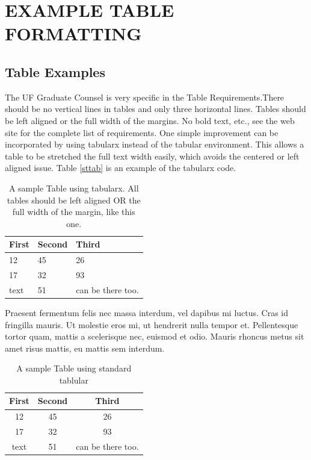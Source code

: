 \documentclass[../main.tex]{subfiles}
\begin{document}
\chapter{EXAMPLE TABLE FORMATTING} \label{lit}

\section{Table Examples}

 The UF Graduate Counsel is very specific in the Table Requirements.There should be no vertical lines in tables and only three horizontal lines. Tables should be left aligned or the full width of the margins. No bold text, etc., see the web site for the complete list of requirements. One simple improvement can be incorporated by using tabularx instead of the tabular environment. This allows a table to be stretched the full text width easily, which avoids the centered or left aligned issue. Table \ref{sttab} is an example of the tabularx code. 
 
\begin{table}[htbp]%
    \caption[Sample tabularx table]{A sample Table using tabularx. All tables should be left aligned OR the full width of the margin, like this one. }\label{sample}
    \begin{tabularx}{6.5in}{XXX}
      \hline
      First & Second & Third \\
      \hline
      12 & 45 & 26 \\
      17 & 32 & 93 \\
      text & 51 & can be there too. \\	
      \hline
    \end{tabularx}
\end{table}
 
 Praesent fermentum felis nec massa interdum, vel dapibus mi luctus. Cras id fringilla mauris. Ut molestie eros mi, ut hendrerit nulla tempor et. Pellentesque tortor quam, mattis a scelerisque nec, euismod et odio. Mauris rhoncus metus sit amet risus mattis, eu mattis sem interdum.

 \begin{table}[t!]
    \caption{A sample Table using standard tablular}\label{tab}
    \begin{tabular}{c c c}
      \hline
      First & Second & Third \\
      \hline
      12 & 45 & 26 \\
      17 & 32 & 93 \\
      text & 51 & can be there too. \\	
      \hline
    \end{tabular}
\end{table}
\end{document}
